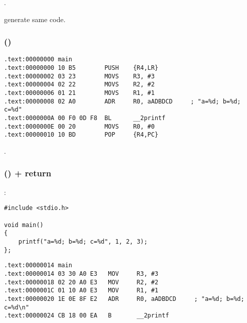 .

\OptimizingKeilVI generate same code.

\subsubsection{\OptimizingKeilVI (\ThumbMode)}

\begin{lstlisting}[caption=\OptimizingKeilVI (\ThumbMode)]
.text:00000000 main
.text:00000000 10 B5        PUSH    {R4,LR}
.text:00000002 03 23        MOVS    R3, #3
.text:00000004 02 22        MOVS    R2, #2
.text:00000006 01 21        MOVS    R1, #1
.text:00000008 02 A0        ADR     R0, aADBDCD     ; "a=%d; b=%d; c=%d"
.text:0000000A 00 F0 0D F8  BL      __2printf
.text:0000000E 00 20        MOVS    R0, #0
.text:00000010 10 BD        POP     {R4,PC}
\end{lstlisting}

.

\subsubsection{\OptimizingKeilVI (\ARMMode) +  return}
\label{ARM_B_to_printf}

 :

\begin{lstlisting}
#include <stdio.h>

void main()
{
	printf("a=%d; b=%d; c=%d", 1, 2, 3);
};
\end{lstlisting}


\begin{lstlisting}[caption=\OptimizingKeilVI (\ARMMode)]
.text:00000014 main
.text:00000014 03 30 A0 E3   MOV     R3, #3
.text:00000018 02 20 A0 E3   MOV     R2, #2
.text:0000001C 01 10 A0 E3   MOV     R1, #1
.text:00000020 1E 0E 8F E2   ADR     R0, aADBDCD     ; "a=%d; b=%d; c=%d\n"
.text:00000024 CB 18 00 EA   B       __2printf
\end{lstlisting}

